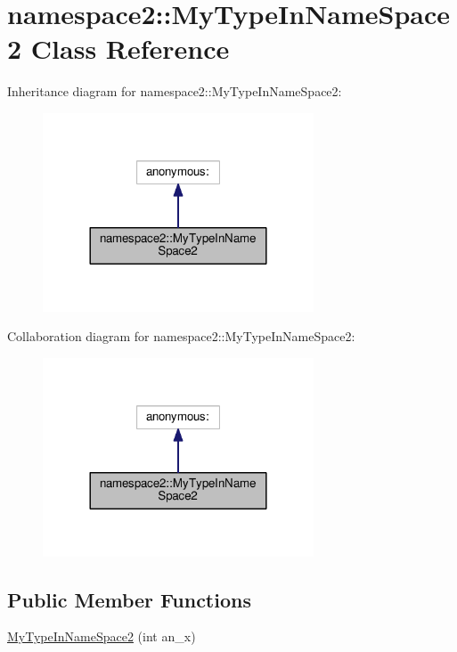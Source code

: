 \hypertarget{classnamespace2_1_1MyTypeInNameSpace2}{}\section{namespace2\+:\+:My\+Type\+In\+Name\+Space2 Class Reference}
\label{classnamespace2_1_1MyTypeInNameSpace2}


Inheritance diagram for namespace2\+:\+:My\+Type\+In\+Name\+Space2\+:
\nopagebreak
\begin{figure}[H]
\begin{center}
\leavevmode
\includegraphics[width=228pt]{classnamespace2_1_1MyTypeInNameSpace2__inherit__graph}
\end{center}
\end{figure}


Collaboration diagram for namespace2\+:\+:My\+Type\+In\+Name\+Space2\+:
\nopagebreak
\begin{figure}[H]
\begin{center}
\leavevmode
\includegraphics[width=228pt]{classnamespace2_1_1MyTypeInNameSpace2__coll__graph}
\end{center}
\end{figure}
\subsection*{Public Member Functions}
\begin{DoxyCompactItemize}
\item 
\hyperlink{classnamespace2_1_1MyTypeInNameSpace2_a033025628289dbf29022b2bfbe66f53e}{My\+Type\+In\+Name\+Space2} (int an\+\_\+x)
\end{DoxyCompactItemize}


